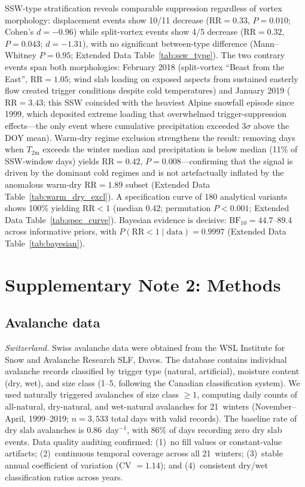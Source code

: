 \documentclass[11pt,letterpaper]{article}
\begin{document}
SSW-type stratification reveals comparable suppression regardless of vortex morphology: displacement events show 10/11 decrease ($\mathrm{RR} = 0.33$, $P = 0.010$; Cohen's $d = -0.96$) while split-vortex events show 4/5 decrease ($\mathrm{RR} = 0.32$, $P = 0.043$; $d = -1.31$), with no significant between-type difference (Mann--Whitney $P = 0.95$; Extended Data Table~\ref{tab:ssw_type}). The two contrary events span both morphologies: February 2018 (split-vortex ``Beast from the East'', $\mathrm{RR} = 1.05$; wind slab loading on exposed aspects from sustained easterly flow created trigger conditions despite cold temperatures) and January 2019 ($\mathrm{RR} = 3.43$; this SSW coincided with the heaviest Alpine snowfall episode since 1999, which deposited extreme loading that overwhelmed trigger-suppression effects---the only event where cumulative precipitation exceeded $3\sigma$ above the DOY mean). Warm-dry regime exclusion strengthens the result: removing days when $T_{\mathrm{2m}}$ exceeds the winter median and precipitation is below median (11\% of SSW-window days) yields $\mathrm{RR} = 0.42$, $P = 0.008$---confirming that the signal is driven by the dominant cold regimes and is not artefactually inflated by the anomalous warm-dry $\mathrm{RR} = 1.89$ subset (Extended Data Table~\ref{tab:warm_dry_excl}). A specification curve of 180 analytical variants shows 100\% yielding $\mathrm{RR} < 1$ (median 0.42; permutation $P < 0.001$; Extended Data Table~\ref{tab:spec_curve}). Bayesian evidence is decisive: $\mathrm{BF}_{10} = 44.7$--$89.4$ across informative priors, with $P(\mathrm{RR} < 1 \mid \mathrm{data}) = 0.9997$ (Extended Data Table~\ref{tab:bayesian}).

\clearpage

\section{Supplementary Note 2: Methods}

\subsection{Avalanche data}

\textit{Switzerland.} Swiss avalanche data were obtained from the WSL Institute for Snow and Avalanche Research SLF, Davos. The database contains individual avalanche records classified by trigger type (natural, artificial), moisture content (dry, wet), and size class (1--5, following the Canadian classification system). We used naturally triggered avalanches of size class $\geq 1$, computing daily counts of all-natural, dry-natural, and wet-natural avalanches for 21~winters (November--April, 1999--2019; $n = 3{,}533$ total days with valid records). The baseline rate of dry slab avalanches is 0.86~day$^{-1}$, with 86\% of days recording zero dry slab events. Data quality auditing confirmed: (1)~no fill values or constant-value artifacts; (2)~continuous temporal coverage across all 21~winters; (3)~stable annual coefficient of variation (CV $= 1.14$); and (4)~consistent dry/wet classification ratios across years.
\end{document}
